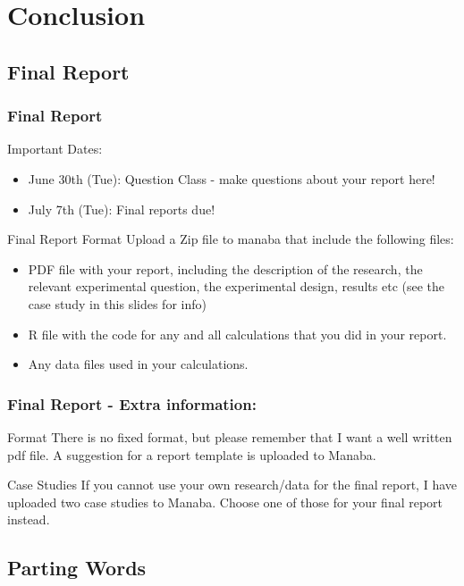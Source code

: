 \documentclass[10pt]{beamer}
\begin{document}
\section{Conclusion}

\subsection{Final Report}
\begin{frame}
  \frametitle{Final Report}
  \begin{block}{Important Dates:}
    \begin{itemize}
    \item June 30th (Tue): Question Class - make questions about your report here!
    \item July 7th (Tue): Final reports due!
    \end{itemize}
  \end{block}
  \begin{block}{Final Report Format}
    Upload a Zip file to manaba that include the following files:
    \begin{itemize}
    \item PDF file with your report, including the description of the
      research, the relevant experimental question, the experimental
      design, results etc (see the case study in this slides for info)
    \item R file with the code for any and all calculations that you
      did in your report.
    \item Any data files used in your calculations.
    \end{itemize}
  \end{block}
\end{frame}

\begin{frame}
  \frametitle{Final Report - Extra information:}
  \begin{block}{Format}
    There is no fixed format, but please remember that I want a well
    written pdf file. A suggestion for a report template is uploaded
    to Manaba.
  \end{block}
  \begin{block}{Case Studies}
    If you cannot use your own research/data for the final report, I
    have uploaded two case studies to Manaba. Choose one of those for
    your final report instead.
  \end{block}
\end{frame}

\subsection{Parting Words}
\end{document}
